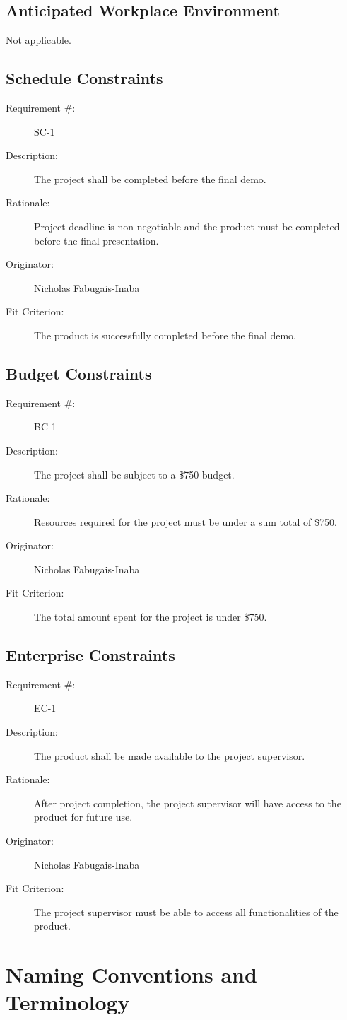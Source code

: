 \documentclass[12pt]{article}
\newenvironment{myreq}[1]{%
\setlist[description]{font=\normalfont\color{darkgray}}%
\begin{tcolorbox}[colframe=black,colback=white, sharp corners, boxrule=1pt]%
\bfseries\color{blue}%
\begin{description}#1}%
{\end{description}\end{tcolorbox}}
\newcommand{\twoinline}[2]{\begin{multicols}{2}#1 #2\end{multicols}}
\newcommand{\reqno}{\item[Requirement \#:]}
\newcommand{\reqdesc}{\item[Description:]}
\newcommand{\reqrat}{\item[Rationale:]}
\newcommand{\reqorig}{\item[Originator:]}
\newcommand{\reqfit}{\item[Fit Criterion:]}
\newcommand{\reqsatis}{\item[Customer Satisfaction:]}
\newcommand{\reqdissat}{\item[Customer Dissatisfaction:]}
\begin{document}
\subsection{Anticipated Workplace Environment}
Not applicable.
\subsection{Schedule Constraints}

\begin{myreq}
  \reqno SC-1
  \reqdesc The project shall be completed before the final demo.
  \reqrat Project deadline is non-negotiable and the product must
  be completed before the final presentation.
  \reqorig Nicholas Fabugais-Inaba
  \reqfit The product is successfully completed before the final demo.
  \twoinline
    {\reqsatis 5}
    {\reqdissat 5}
\end{myreq}

\subsection{Budget Constraints}

\begin{myreq}
  \reqno BC-1
  \reqdesc The project shall be subject to a \$750 budget.
  \reqrat Resources required for the project must be under a sum total of
  \$750.
  \reqorig Nicholas Fabugais-Inaba
  \reqfit The total amount spent for the project is under \$750.
  \twoinline
    {\reqsatis 5}
    {\reqdissat 5}
\end{myreq}

\subsection{Enterprise Constraints}

\begin{myreq}
  \reqno EC-1
  \reqdesc The product shall be made available to the project supervisor.
  \reqrat After project completion, the project supervisor will have
  access to the product for future use. 
  \reqorig Nicholas Fabugais-Inaba
  \reqfit The project supervisor must be able to access all functionalities
  of the product.
  \twoinline
    {\reqsatis 5}
    {\reqdissat 5}
\end{myreq}

\section{Naming Conventions and Terminology}
\end{document}
